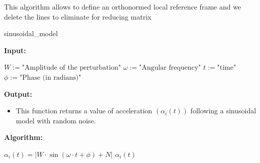 \documentclass{article}
\begin{document}
			This algorithm allows to define an orthonormed local reference frame and we delete the lines to eliminate for reducing matrix
			
			\begin{algorithm}[H]
				\caption{sinusoidal\_model}\label{alg:sinusoidal_model}
				\begin{algorithmic}
					\State \textbf{Input:} \\
					\begin{itemize}
						\State $W := \text{"Amplitude of the perturbation"}$
						\State $\omega := \text{"Angular frequency"}$
						\State $t := \text{"time"}$
						\State $\phi := \text{"Phase (in radians)"}$
					\end{itemize}
					\State \textbf{Output:} \\
					\begin{itemize}
						\item This function returns a value of acceleration $(\alpha_i(t))$ following a sinusoidal model with random noise.
					\end{itemize}
					
					\State \textbf{Algorithm:} \\
					\begin{itemize}
						\State $ \alpha_i(t) = \left| W \cdot \sin(\omega \cdot t + \phi) + N \right|$ 
						\State {}
						\State \Return $\alpha_i(t)$
					\end{itemize}
				\end{algorithmic}
			\end{algorithm}
			
\end{document}
